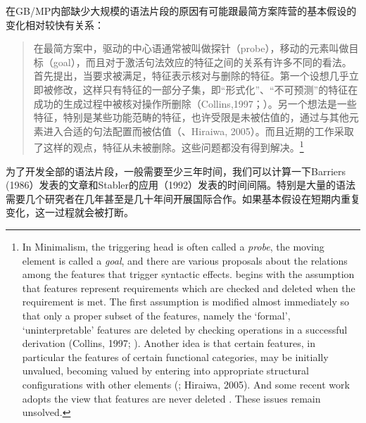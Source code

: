 在GB/MP内部缺少大规模的语法片段的原因有可能跟最简方案阵营的基本假设的变化相对较快有关系：
\begin{quotation}
\label{Zitat-Stabler}
在最简方案中，驱动的中心语通常被叫做探针（probe），移动的元素叫做目标（goal），而且对于激活句法效应的特征之间的关系有许多不同的看法。 \citet[p.\,229]{Chomsky95a-u} 首先提出，当要求被满足，特征表示核对与删除的特征。第一个设想几乎立即被修改，这样只有特征的一部分子集，即“形式化”、“不可预测”的特征在成功的生成过程中被核对操作所删除（Collins,1997；\citealp[§4.5]{Chomsky95a-u}）。另一个想法是一些特征，特别是某些功能范畴的特征，也许受限是未被估值的，通过与其他元素进入合适的句法配置而被估值（\citealp{Chomsky2008a}、Hiraiwa, 2005）。而且近期的工作采取了这样的观点，特征从未被删除\citep[p.\,11]{Chomsky2007a}。这些问题都没有得到解决。\citep[]{Stabler2010a}\footnote{%
In Minimalism, the triggering head is often called a \emph{probe}, the moving element is called a
\emph{goal}, and there are various proposals about the relations among the features that trigger
syntactic effects.  \citet[p.\,229]{Chomsky95a-u} begins with the assumption that features represent
requirements which are checked and deleted when the requirement is met. The first assumption is
modified almost immediately so that only a proper subset of the features, namely the `formal',
`uninterpretable' features are deleted by checking operations in a successful derivation (Collins,
1997; \citealp[§4.5]{Chomsky95a-u}). Another idea is that certain features, in particular the
features of certain functional categories, may be initially unvalued, becoming valued by entering
into appropriate structural configurations with other elements (\citealp{Chomsky2008a}; Hiraiwa,
2005). And some recent work adopts the view that features are never deleted
\citep[p.\,11]{Chomsky2007a}. These issues remain unsolved.}
\end{quotation}
为了开发全部的语法片段，一般需要至少三年时间，我们可以计算一下Barriers (1986）发表的文章和Stabler的应用（1992）发表的时间间隔。特别是大量的语法需要几个研究者在几年甚至是几十年间开展国际合作。如果基本假设在短期内重复变化，这一过程就会被打断。

